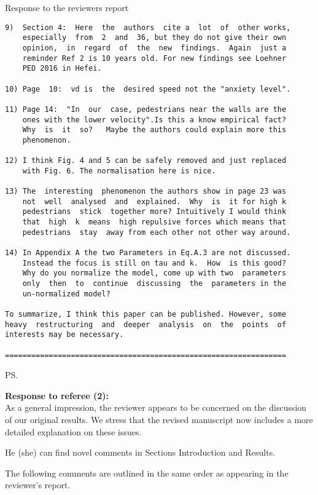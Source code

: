 \documentclass[a4paper,12pt]{letter}
\begin{document}
\begin{letter}{Response to the reviewers report}
\begin{verbatim}
9)  Section 4:  Here  the  authors  cite a  lot  of  other works,
    especially  from  2  and  36, but they do not give their own 
    opinion,  in  regard  of  the  new  findings.  Again  just a 
    reminder Ref 2 is 10 years old. For new findings see Loehner
    PED 2016 in Hefei.

10) Page  10:  vd is  the  desired speed not the "anxiety level".

11) Page 14:  "In  our  case, pedestrians near the walls are the
    ones with the lower velocity".Is this a know empirical fact?
    Why  is  it  so?   Maybe the authors could explain more this
    phenomenon. 

12) I think Fig. 4 and 5 can be safely removed and just replaced 
    with Fig. 6. The normalisation here is nice.

13) The  interesting  phenomenon the authors show in page 23 was
    not  well  analysed  and  explained.  Why  is  it for high k
    pedestrians  stick  together more? Intuitively I would think
    that  high  k  means  high repulsive forces which means that
    pedestrians  stay  away from each other not other way around.

14) In Appendix A the two Parameters in Eq.A.3 are not discussed. 
    Instead the focus is still on tau and k.  How  is this good? 
    Why do you normalize the model, come up with two  parameters
    only  then  to  continue  discussing  the  parameters in the 
    un-normalized model?

To summarize, I think this paper can be published. However, some
heavy  restructuring  and  deeper  analysis  on  the  points  of 
interests may be necessary. 

================================================================

\end{verbatim}


\ps{\textbf{Response to referee (2):} \\

As a general impression, the reviewer appears to be concerned on the discussion of our original results. 
We stress that the revised manuscript now includes a more detailed explanation on these issues. 

He (she) can find novel comments in Sections Introduction and Results. 

The following comments are outlined in the same order as appearing in the
reviewer’s report. \\

}
\end{letter}
\end{document}

